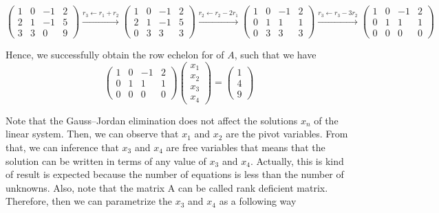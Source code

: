 \documentclass[12pt]{amsart}
\begin{document}
\[
\begin{pmatrix}
 1 & 0& -1& 2\\ 
 2&  1& -1& 5\\ 
 3&  3& 0& 9
\end{pmatrix} \overset{r_3 \leftarrow r_1+r_2}{\longrightarrow} 
\begin{pmatrix}
 1 & 0& -1& 2\\ 
 2&  1& -1& 5\\ 
 0&  3& 3& 3
\end{pmatrix}  \overset{r_2 \leftarrow r_2-2r_1}{\longrightarrow} 
\begin{pmatrix}
  1 & 0& -1& 2\\ 
 0&  1& 1& 1\\ 
 0&  3& 3& 3
\end{pmatrix} \overset{r_3 \leftarrow r_3-3r_2}{\longrightarrow} 
\begin{pmatrix}
 1 & 0& -1& 2\\ 
 0&  1& 1& 1\\ 
 0&  0& 0& 0
\end{pmatrix}
\]

Hence, we successfully obtain the row echelon for of $A$, such that we have
\[
\begin{pmatrix}
 1 & 0& -1& 2\\ 
 0&  1& 1& 1\\ 
 0&  0& 0& 0
\end{pmatrix}
\begin{pmatrix}
 x_{1}  \\ 
 x_{2}  \\ 
 x_{3}  \\
 x_{4}
\end{pmatrix} = 
\begin{pmatrix}
1 \\
4 \\
9 
\end{pmatrix}
\]

Note that the Gauss–Jordan elimination does not affect the solutions $x_n$ of the linear system. Then, we can observe that $x_1$  and $x_2$ are the pivot variables. From that, we can inference that $x_3$ and $x_4$ are free variables that means that the solution can be written in terms of any value of $x_3$ and $x_4$.  Actually, this is kind of result is expected because the number of equations is less than the number of unknowns. Also, note that the matrix A can be called rank deficient matrix. Therefore, then we can parametrize the $x_3$ and $x_4$ as a following way
\end{document}

